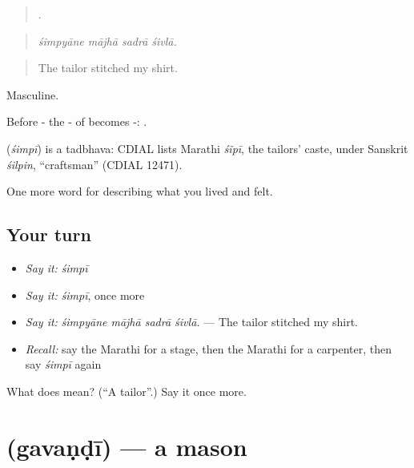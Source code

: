 \begin{quote}
   .
\end{quote}

\begin{quote}
\emph{śimpyāne mājhā sadrā śivlā.}
\end{quote}

\begin{quote}
The tailor stitched my shirt.
\end{quote}

Masculine.

Before - the - of  becomes -: .

\begin{cousinweb}
\textbf{} (\emph{śimpī}) is a tadbhava: CDIAL lists Marathi \emph{śĩpī}, the tailors' caste, under Sanskrit \emph{śilpin}, \textquotedblleft{}craftsman\textquotedblright{} (CDIAL 12471).
\end{cousinweb}

\begin{grammarlens}[title={What you've built}]
One more word for describing what you lived and felt.
\end{grammarlens}

\subsection*{Your turn}
\begin{itemize}
\raggedright
  \item \emph{Say it:} \emph{śimpī}
  \item \emph{Say it:} \emph{śimpī}, once more
  \item \emph{Say it:} \emph{śimpyāne mājhā sadrā śivlā.} — The tailor stitched my shirt.
  \item \emph{Recall:} say the Marathi for a stage, then the Marathi for a carpenter, then say \emph{śimpī} again
\end{itemize}

\begin{tcolorbox}[breakable,colback=teal!4,colframe=teal!35!black,title={Before you move on}]
What does  mean? (\textquotedblleft{}A tailor\textquotedblright{}.) Say it once more.
\end{tcolorbox}
\section[\texorpdfstring{\mr{गवंडी} (gavaṇḍī)}{गवंडी (gavaṇḍī)}]{ (gavaṇḍī) — a mason}

